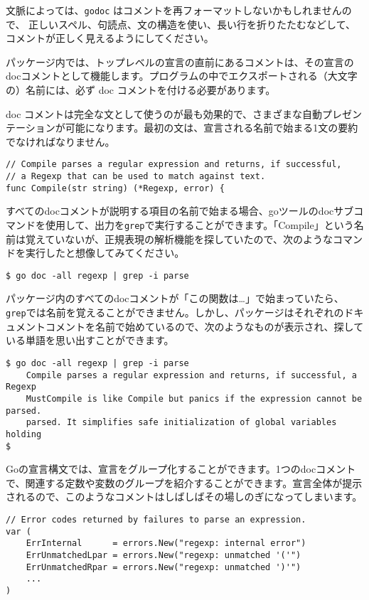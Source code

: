 \documentclass{jsarticle}
\begin{document}
文脈によっては、\texttt{godoc}
はコメントを再フォーマットしないかもしれませんので、
正しいスペル、句読点、文の構造を使い、長い行を折りたたむなどして、
コメントが正しく見えるようにしてください。

パッケージ内では、トップレベルの宣言の直前にあるコメントは、その宣言のdocコメントとして機能します。プログラムの中でエクスポートされる（大文字の）名前には、必ず
doc コメントを付ける必要があります。

doc
コメントは完全な文として使うのが最も効果的で、さまざまな自動プレゼンテーションが可能になります。最初の文は、宣言される名前で始まる1文の要約でなければなりません。

\begin{lstlisting}[numbers=none]
// Compile parses a regular expression and returns, if successful,
// a Regexp that can be used to match against text.
func Compile(str string) (*Regexp, error) {
\end{lstlisting}

すべてのdocコメントが説明する項目の名前で始まる場合、{go}ツールの{doc}サブコマンドを使用して、出力を\texttt{grep}で実行することができます。「Compile」という名前は覚えていないが、正規表現の解析機能を探していたので、次のようなコマンドを実行したと想像してみてください。

\begin{lstlisting}[numbers=none]
$ go doc -all regexp | grep -i parse
\end{lstlisting}

パッケージ内のすべてのdocコメントが「この関数は\ldots」で始まっていたら、\texttt{grep}では名前を覚えることができません。しかし、パッケージはそれぞれのドキュメントコメントを名前で始めているので、次のようなものが表示され、探している単語を思い出すことができます。

\begin{lstlisting}[numbers=none]
$ go doc -all regexp | grep -i parse
    Compile parses a regular expression and returns, if successful, a Regexp
    MustCompile is like Compile but panics if the expression cannot be parsed.
    parsed. It simplifies safe initialization of global variables holding
$
\end{lstlisting}

Goの宣言構文では、宣言をグループ化することができます。1つのdocコメントで、関連する定数や変数のグループを紹介することができます。宣言全体が提示されるので、このようなコメントはしばしばその場しのぎになってしまいます。

\begin{lstlisting}[numbers=none]
// Error codes returned by failures to parse an expression.
var (
    ErrInternal      = errors.New("regexp: internal error")
    ErrUnmatchedLpar = errors.New("regexp: unmatched '('")
    ErrUnmatchedRpar = errors.New("regexp: unmatched ')'")
    ...
)
\end{lstlisting}
\end{document}
